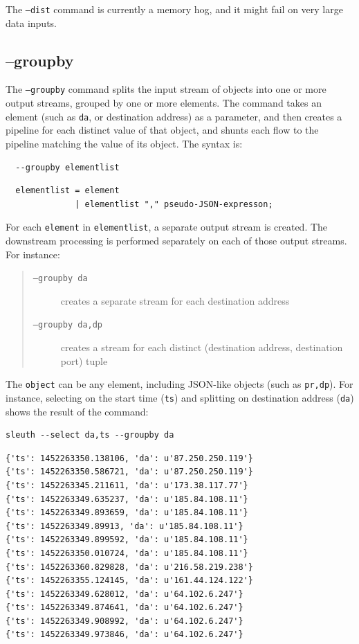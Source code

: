 \documentclass{book}
\begin{document}
The \texttt{--dist} command is currently a memory hog, and it might fail on
very large data inputs.

\subsection{--groupby}
\label{groupby}
The \texttt{--groupby} command splits the input stream of objects into
one or more output streams, grouped by one or more elements.  The
command takes an element (such as \texttt{da}, or destination address)
as a parameter, and then creates a pipeline for each distinct value of
that object, and shunts each flow to the pipeline matching the value
of its object.  The syntax is:
\begin{verbatim}
  --groupby elementlist 
\end{verbatim}
\begin{verbatim}
  elementlist = element
              | elementlist "," pseudo-JSON-expresson;
\end{verbatim}
For each \texttt{element} in \texttt{elementlist}, a separate output
stream is created.  The downstream processing is performed
separately on each of those output streams.  For instance:
\begin{quote}
\begin{description}
  \item [\texttt{--groupby da}] creates a separate stream for each destination address
  \item [\texttt{--groupby da,dp}] creates a stream for each distinct (destination
 address, destination port) tuple
\end{description}
\end{quote}

The \texttt{object} can be any element, including JSON-like objects (such as \texttt{pr,dp}).
For instance, selecting on the start time (\texttt{ts}) and splitting on destination address
(\texttt{da}) shows the result of the command:
\begin{mdframed}[style=cli]
\begin{verbatim}
sleuth --select da,ts --groupby da
\end{verbatim}
\begin{verbatim}
{'ts': 1452263350.138106, 'da': u'87.250.250.119'}
{'ts': 1452263350.586721, 'da': u'87.250.250.119'}
{'ts': 1452263345.211611, 'da': u'173.38.117.77'}
{'ts': 1452263349.635237, 'da': u'185.84.108.11'}
{'ts': 1452263349.893659, 'da': u'185.84.108.11'}
{'ts': 1452263349.89913, 'da': u'185.84.108.11'}
{'ts': 1452263349.899592, 'da': u'185.84.108.11'}
{'ts': 1452263350.010724, 'da': u'185.84.108.11'}
{'ts': 1452263360.829828, 'da': u'216.58.219.238'}
{'ts': 1452263355.124145, 'da': u'161.44.124.122'}
{'ts': 1452263349.628012, 'da': u'64.102.6.247'}
{'ts': 1452263349.874641, 'da': u'64.102.6.247'}
{'ts': 1452263349.908992, 'da': u'64.102.6.247'}
{'ts': 1452263349.973846, 'da': u'64.102.6.247'}
\end{verbatim}
\end{mdframed}
\end{document}
